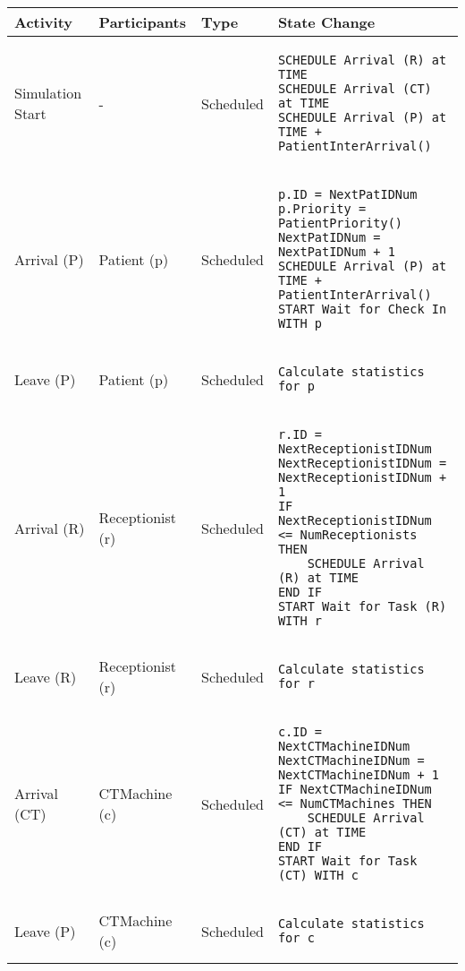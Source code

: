 \begin{tabular}{@{}>{\raggedright\arraybackslash}p{1.5cm}>{\raggedright\arraybackslash}p{2.1cm}>{\raggedright\arraybackslash}p{2.2cm}>{\raggedright\arraybackslash}p{10cm}@{}}
  \toprule
  Activity          & Participants & Type       & State Change \\ \midrule
  Simulation Start & -  & Scheduled  & 
  \vspace{-12pt}
  \begin{lstlisting}[language=CMPseudo]
SCHEDULE Arrival (R) at TIME
SCHEDULE Arrival (CT) at TIME
SCHEDULE Arrival (P) at TIME + PatientInterArrival()
  \end{lstlisting}
  \\ \midrule
  Arrival (P) & Patient (p)  & Scheduled  & 
  \vspace{-12pt}
  \begin{lstlisting}[language=CMPseudo]
p.ID = NextPatIDNum
p.Priority = PatientPriority()
NextPatIDNum = NextPatIDNum + 1
SCHEDULE Arrival (P) at TIME + PatientInterArrival()
START Wait for Check In WITH p
  \end{lstlisting}
  \\ \midrule
  Leave (P) & Patient (p)  & Scheduled  & 
  \vspace{-12pt}
  \begin{lstlisting}[language=CMPseudo]
Calculate statistics for p
  \end{lstlisting}
  \\ \midrule
  Arrival (R) & Receptionist (r)  & Scheduled  & 
  \vspace{-12pt}
  \begin{lstlisting}[language=CMPseudo]
r.ID = NextReceptionistIDNum
NextReceptionistIDNum = NextReceptionistIDNum + 1
IF NextReceptionistIDNum <= NumReceptionists THEN
    SCHEDULE Arrival (R) at TIME
END IF
START Wait for Task (R) WITH r
  \end{lstlisting}
  \\ \midrule
  Leave (R) & Receptionist (r)  & Scheduled  & 
  \vspace{-12pt}
  \begin{lstlisting}[language=CMPseudo]
Calculate statistics for r
  \end{lstlisting}
  \\ \midrule
  Arrival (CT) & CTMachine (c)  & Scheduled  & 
  \vspace{-12pt}
  \begin{lstlisting}[language=CMPseudo]
c.ID = NextCTMachineIDNum
NextCTMachineIDNum = NextCTMachineIDNum + 1
IF NextCTMachineIDNum <= NumCTMachines THEN
    SCHEDULE Arrival (CT) at TIME
END IF
START Wait for Task (CT) WITH c
  \end{lstlisting}
  \\ \midrule
  Leave (P) & CTMachine (c)  & Scheduled  & 
  \vspace{-12pt}
  \begin{lstlisting}[language=CMPseudo]
Calculate statistics for c
  \end{lstlisting}
  \\ \bottomrule
  \end{tabular}